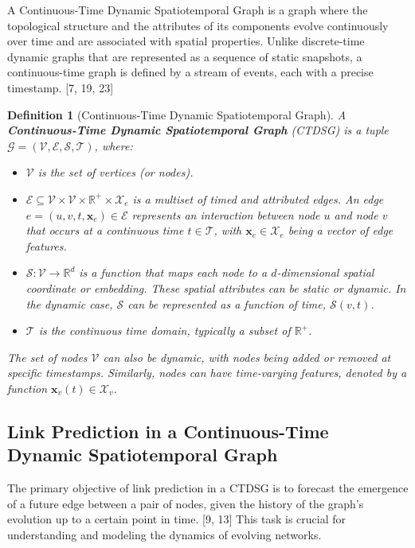 \documentclass{article}
\newtheorem{definition}{Definition}
\begin{document}
A Continuous-Time Dynamic Spatiotemporal Graph is a graph where the topological structure and the attributes of its components evolve continuously over time and are associated with spatial properties. Unlike discrete-time dynamic graphs that are represented as a sequence of static snapshots, a continuous-time graph is defined by a stream of events, each with a precise timestamp. [7, 19, 23]

\begin{definition}[Continuous-Time Dynamic Spatiotemporal Graph]
A \textbf{Continuous-Time Dynamic Spatiotemporal Graph} (CTDSG) is a tuple $\mathcal{G} = (\mathcal{V}, \mathcal{E}, \mathcal{S}, \mathcal{T})$, where:
\begin{itemize}
    \item $\mathcal{V}$ is the set of vertices (or nodes).
    \item $\mathcal{E} \subseteq \mathcal{V} \times \mathcal{V} \times \mathbb{R}^+ \times \mathcal{X}_e$ is a multiset of timed and attributed edges. An edge $e = (u, v, t, \mathbf{x}_e) \in \mathcal{E}$ represents an interaction between node $u$ and node $v$ that occurs at a continuous time $t \in \mathcal{T}$, with $\mathbf{x}_e \in \mathcal{X}_e$ being a vector of edge features.
    \item $\mathcal{S}: \mathcal{V} \to \mathbb{R}^d$ is a function that maps each node to a $d$-dimensional spatial coordinate or embedding. These spatial attributes can be static or dynamic. In the dynamic case, $\mathcal{S}$ can be represented as a function of time, $\mathcal{S}(v, t)$.
    \item $\mathcal{T}$ is the continuous time domain, typically a subset of $\mathbb{R}^+$.
\end{itemize}
The set of nodes $\mathcal{V}$ can also be dynamic, with nodes being added or removed at specific timestamps. Similarly, nodes can have time-varying features, denoted by a function $\mathbf{x}_v(t) \in \mathcal{X}_v$.
\end{definition}

\subsection{Link Prediction in a Continuous-Time Dynamic Spatiotemporal Graph}

The primary objective of link prediction in a CTDSG is to forecast the emergence of a future edge between a pair of nodes, given the history of the graph's evolution up to a certain point in time. [9, 13] This task is crucial for understanding and modeling the dynamics of evolving networks.
\end{document}

